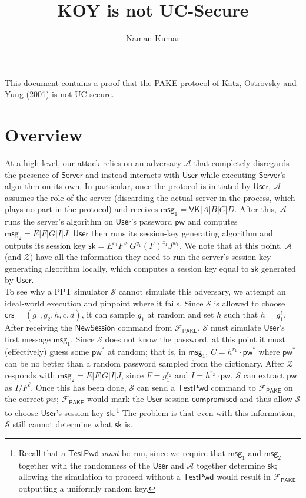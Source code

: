 \documentclass[12pt,a4paper]{article}
\title{\textbf{KOY is not UC-Secure}}
\author{Naman Kumar}
\newcommand{\simulator}{\mathcal{S}}
\newcommand{\env}{\mathcal{Z}}
\newcommand{\adv}{\mathcal{A}}
\newcommand{\pake}{\mathcal{F}_{\mathsf{PAKE}}}
\newcommand{\user}{\mathsf{User}}
\newcommand{\sk}{\mathsf{sk}}
\newcommand{\pw}{\mathsf{pw}}
\newcommand{\crs}{\mathsf{crs}}
\newcommand{\newsession}{\mathsf{NewSession}}
\newcommand{\testpwd}{\mathsf{TestPwd}}
\newcommand{\compromised}{\mathsf{compromised}}
\newcommand{\server}{\mathsf{Server}}
\newcommand{\msg}[1]{\mathsf{msg}_{#1}}
\begin{document}
	\maketitle
	
	This document contains a proof that the PAKE protocol of Katz, Ostrovsky and Yung (2001) is not UC-secure.
	
	\section{Overview}
	
	At a high level, our attack relies on an adversary $\adv$ that completely disregards the presence of $\server$ and instead interacts with $\user$ while executing $\server$'s algorithm on its own. In particular, once the protocol is initiated by $\user$, $\adv$ assumes the role of the server (discarding the actual server in the process, which plays no part in the protocol) and receives $\msg{1} = \mathsf{VK}|A|B|C|D$. After this, $\adv$ runs the server's algorithm on $\user$'s password $\pw$ and computes $\msg{2} = E|F|G|I|J$. $\user$ then runs its session-key generating algorithm and outputs its session key $\sk = E^{r_1}F^{x_1}G^{y_1}(I')^{z_1}J^{w_1}$. We note that at this point, $\adv$ (and $\env$) have all the information they need to run the server's session-key generating algorithm locally, which computes a session key equal to $\sk$ generated by $\user$.\\
	
	To see why a PPT simulator $\simulator$ cannot simulate this adversary, we attempt an ideal-world execution and pinpoint where it fails. Since $\simulator$ is allowed to choose $\crs=(g_1, g_2, h, c, d)$, it can sample $g_1$ at random and set $h$ such that $h=g_1^{\ell}$. After receiving the $\newsession$ command from $\pake$, $\simulator$ must simulate $\user$'s first message $\msg{1}$. Since $\simulator$ does not know the password, at this point it must (effectively) guess some $\pw^*$ at random; that is, in $\msg{1}$, $C=h^{r_1}\cdot\pw^*$ where $\pw^*$ can be no better than a random password sampled from the dictionary. After $\env$ responds with $\msg{2} = E|F|G|I|J$, since $F = g_1^{r_2}$ and $I = h^{r_2} \cdot \pw$, $\simulator$ can extract $\pw$ as $I/F^\ell$. Once this has been done, $\simulator$ can send a $\testpwd$ command to $\pake$ on the correct $pw$; $\pake$ would mark the $\user$ session $\compromised$ and thus allow $\simulator$ to choose $\user$'s session key $\sk$.\footnote{Recall that a $\testpwd$ \textit{must} be run, since we require that $\msg{1}$ and $\msg{2}$ together with the randomness of the $\user$ and $\adv$ together determine $\sk$; allowing the simulation to proceed without a $\testpwd$ would result in $\pake$ outputting a uniformly random key.} The problem is that even with this information, $\simulator$ still cannot determine what $\sk$ is.\\
	
\end{document}
